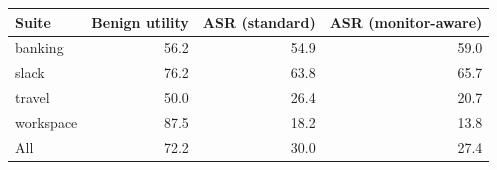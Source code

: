 \begin{tabular}{lrrr}
\toprule
Suite & Benign utility & ASR (standard) & ASR (monitor-aware) \\
\midrule
banking & 56.2 & 54.9 & 59.0 \\
slack & 76.2 & 63.8 & 65.7 \\
travel & 50.0 & 26.4 & 20.7 \\
workspace & 87.5 & 18.2 & 13.8 \\
\midrule
All & 72.2 & 30.0 & 27.4 \\
\bottomrule
\end{tabular}

